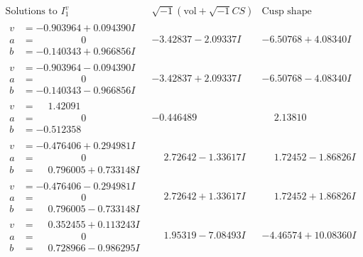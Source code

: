 \documentclass[1p]{elsarticle_modified}
\theoremstyle{definition}
\newcommand{\I}{\sqrt{-1}}
\begin{document}
$$\begin{array}{c|c|c}  
\text{Solutions to }I^v_{1}& \I (\text{vol} + \sqrt{-1}CS) & \text{Cusp shape}\\
 \hline 
\begin{aligned}
v &= -0.903964 + 0.094390 I \\
a &= \phantom{-0.000000 } 0 \\
b &= -0.140343 + 0.966856 I\end{aligned}
 & -3.42837 - 2.09337 I & -6.50768 + 4.08340 I \\ \hline\begin{aligned}
v &= -0.903964 - 0.094390 I \\
a &= \phantom{-0.000000 } 0 \\
b &= -0.140343 - 0.966856 I\end{aligned}
 & -3.42837 + 2.09337 I & -6.50768 - 4.08340 I \\ \hline\begin{aligned}
v &= \phantom{-}1.42091\phantom{ +0.000000I} \\
a &= \phantom{-0.000000 } 0 \\
b &= -0.512358\phantom{ +0.000000I}\end{aligned}
 & -0.446489\phantom{ +0.000000I} & \phantom{-}2.13810\phantom{ +0.000000I} \\ \hline\begin{aligned}
v &= -0.476406 + 0.294981 I \\
a &= \phantom{-0.000000 } 0 \\
b &= \phantom{-}0.796005 + 0.733148 I\end{aligned}
 & \phantom{-}2.72642 - 1.33617 I & \phantom{-}1.72452 - 1.86826 I \\ \hline\begin{aligned}
v &= -0.476406 - 0.294981 I \\
a &= \phantom{-0.000000 } 0 \\
b &= \phantom{-}0.796005 - 0.733148 I\end{aligned}
 & \phantom{-}2.72642 + 1.33617 I & \phantom{-}1.72452 + 1.86826 I \\ \hline\begin{aligned}
v &= \phantom{-}0.352455 + 0.113243 I \\
a &= \phantom{-0.000000 } 0 \\
b &= \phantom{-}0.728966 - 0.986295 I\end{aligned}
 & \phantom{-}1.95319 - 7.08493 I & -4.46574 + 10.08360 I \\ \hline\begin{aligned}

\end{aligned}
\end{array}$$
\end{document}
